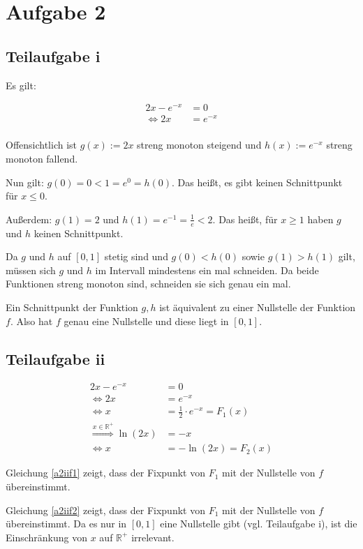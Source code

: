 \section*{Aufgabe 2}
\subsection*{Teilaufgabe i}
Es gilt:

\begin{align}
    2x - e^{-x} &= 0\\
    \Leftrightarrow 2x &= e^{-x}\\
\end{align}

Offensichtlich ist $g(x) := 2x$ streng monoton steigend und $h(x) := e^{-x}$ streng
monoton fallend.

Nun gilt: $g(0) = 0 < 1 = e^0 = h(0)$. Das heißt, es gibt keinen
Schnittpunkt für $x \leq 0$.

Außerdem: $g(1) = 2$ und $h(1) = e^{-1} = \frac{1}{e} < 2$.
Das heißt, für $x \geq 1$ haben $g$ und $h$ keinen Schnittpunkt.

Da $g$ und $h$ auf $[0,1]$ stetig sind und $g(0) < h(0)$ sowie $g(1) > h(1)$
gilt, müssen sich $g$ und $h$ im Intervall mindestens ein mal schneiden.
Da beide Funktionen streng monoton sind, schneiden sie sich genau
ein mal.

Ein Schnittpunkt der Funktion $g,h$ ist äquivalent zu einer
Nullstelle der Funktion $f$. Also hat $f$ genau eine Nullstelle
und diese liegt in $[0,1]$.

\subsection*{Teilaufgabe ii}
    \begin{align}
        2x - e^{-x} &= 0\\
    \Leftrightarrow 2x &= e^{-x}\\
    \Leftrightarrow x &= \frac{1}{2} \cdot e^{-x} = F_1(x) \label{a2iif1}\\
    \stackrel{x \in \mathbb{R}^+}{\Rightarrow} \ln(2x) &= -x\\
    \Leftrightarrow x &= - \ln(2x) = F_2(x)\label{a2iif2}
    \end{align}

Gleichung \ref{a2iif1} zeigt, dass der Fixpunkt von $F_1$ mit der
Nullstelle von $f$ übereinstimmt.

Gleichung \ref{a2iif2} zeigt, dass der Fixpunkt von $F_1$ mit der
Nullstelle von $f$ übereinstimmt. Da es nur in $[0,1]$ eine Nullstelle
gibt (vgl. Teilaufgabe i), ist die Einschränkung von $x$ auf $\mathbb{R}^+$
irrelevant.

